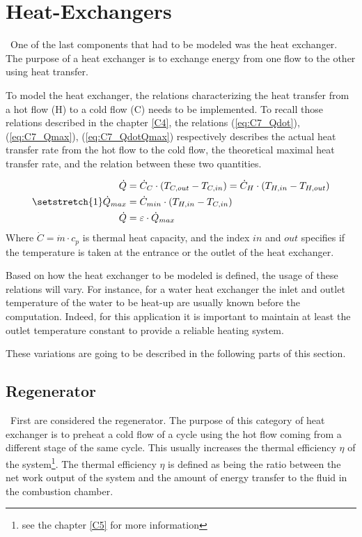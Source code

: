 \section{Heat-Exchangers}
\quad\ One of the last components that had to be modeled was the heat exchanger. The purpose of a heat exchanger is to exchange energy from one flow to the other using heat transfer. 

To model the heat exchanger, the relations characterizing the heat transfer from a hot flow (H) to a cold flow (C) needs to be implemented. To recall those relations described in the chapter \ref{C4}, the relations (\ref{eq:C7_Qdot}), (\ref{eq:C7_Qmax}),  (\ref{eq:C7_QdotQmax}) respectively describes the actual heat transfer rate from the hot flow to the cold flow, the theoretical maximal heat transfer rate, and the relation between these two quantities.   

\begin{subequations}
\setstretch{1}
\begin{align}
    \dot{Q} &= \dot{C}_C\cdot (T_{C,out} - T_{C,in}) = \dot{C}_H\cdot(T_{H,in} - T_{H,out})\label{eq:C7_Qdot}\\
    \dot{Q}_{max} &= \dot{C}_{min}\cdot (T_{H,in} - T_{C,in})\label{eq:C7_Qmax}\\
    \dot{Q} &= \varepsilon\cdot\dot{Q}_{max}\label{eq:C7_QdotQmax}
\end{align}
\end{subequations}
Where $\dot{C} = \dot{m}\cdot c_p$ is thermal heat capacity, and the index $in$ and $out$ specifies if the temperature is taken at the entrance or the outlet of the heat exchanger. 

Based on how the heat exchanger to be modeled is defined, the usage of these relations will vary. For instance, for a water heat exchanger the inlet and outlet temperature of the water to be heat-up are usually known before the computation. Indeed, for this application it is important to maintain at least the outlet temperature constant to provide a reliable heating system. 

These variations are going to be described in the following parts of this section.

\subsection{Regenerator}
\quad\ First are considered the regenerator. The purpose of this category of heat exchanger is to preheat a cold flow of a cycle using the hot flow coming from a different stage of the same cycle. This usually increases the thermal efficiency $\eta$ of the system\footnote{see the chapter \ref{C5} for more information}. The thermal efficiency $\eta$ is defined as being the ratio between the net work output of the system and the amount of energy transfer to the fluid in the combustion chamber. 

